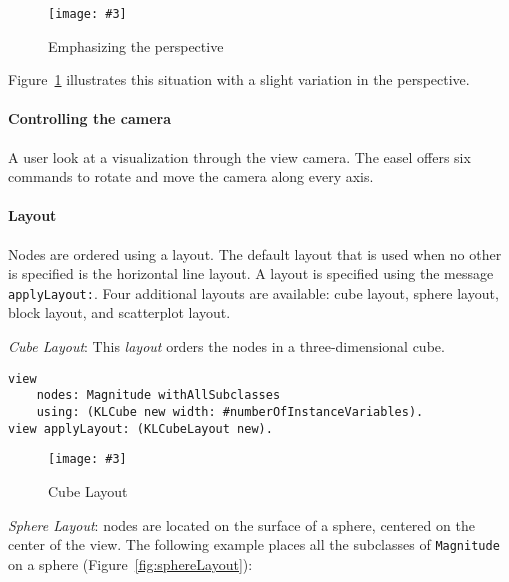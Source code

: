 \documentclass{sig-alternate}
\newcommand{\ct}{\lstinline[backgroundcolor=\color{white},basicstyle=\footnotesize\ttfamily]}
\newcommand{\fig}[4]{
	\begin{figure}[#1]
		\centering
		\texttt{[image: \#3]}
		\caption{\label{fig:#3}#4}
	\end{figure}}
\newcommand{\figref}[1]{Figure~\ref{fig:#1}}
\begin{document}
\fig{h}{0.5}{perspective}{Emphasizing the perspective}

\figref{perspective} illustrates this situation with a slight variation in the perspective.

\paragraph{Controlling the camera}
A user look at a visualization through the view camera. The easel offers six commands to rotate and move the camera along every axis. 
%   

\paragraph{Layout}
Nodes are ordered using a layout. The default layout that is used when no other is specified is the horizontal line layout. A layout is specified using the message \ct{applyLayout:}. Four additional layouts are available: cube layout, sphere layout, block layout, and scatterplot layout.

\emph{Cube Layout}: This \emph{layout} orders the nodes in a three-dimensional cube.


\begin{lstlisting}
view 
	nodes: Magnitude withAllSubclasses 
	using: (KLCube new width: #numberOfInstanceVariables).
view applyLayout: (KLCubeLayout new). 
\end{lstlisting}
\fig{}{0.3}{cubeLayout}{Cube Layout}

\emph{Sphere Layout}: nodes are located on the surface of a sphere, centered on the center of the view. The following example places all the subclasses of \ct{Magnitude} on a sphere (\figref{sphereLayout}):
\end{document}
